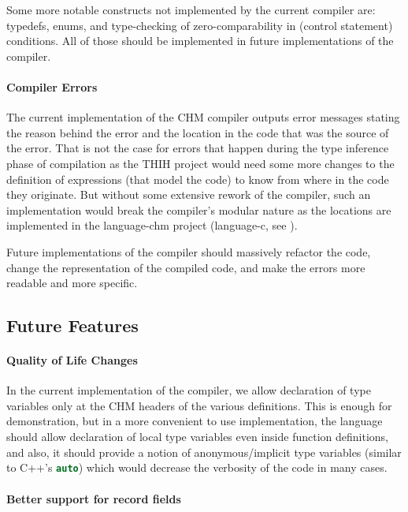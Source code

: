 Some more notable constructs not implemented by the current compiler are: typedefs, enums, and type-checking of zero-comparability in (control statement) conditions. All of those should be implemented in future implementations of the compiler.

\paragraph{Compiler Errors}

The current implementation of the CHM compiler outputs error messages stating the reason behind the error and the location in the code that was the source of the error. That is not the case for errors that happen during the type inference phase of compilation as the THIH \cite{jones1999typing} project would need some more changes to the definition of expressions (that model the code) to know from where in the code they originate. But without some extensive rework of the compiler, such an implementation would break the compiler's modular nature as the locations are implemented in the language-chm project (language-c, see \cite{visq2018language-c}).

Future implementations of the compiler should massively refactor the code, change the representation of the compiled code, and make the errors more readable and more specific.

\subsection{Future Features}

\paragraph{Quality of Life Changes}

In the current implementation of the compiler, we allow declaration of type variables only at the CHM headers of the various definitions. This is enough for demonstration, but in a more convenient to use implementation, the language should allow declaration of local type variables even inside function definitions, and also, it should provide a notion of anonymous/implicit type variables (similar to C++'s \lstinline[language=c++]{auto}) which would decrease the verbosity of the code in many cases.

\paragraph{Better support for record fields}

